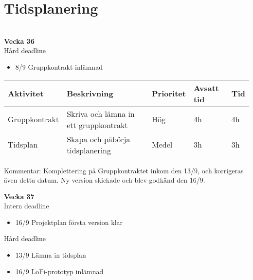 \documentclass{mall}
\begin{document}
\pagebreak

\section{Tidsplanering} \\

\hphantom{$\bullet$} \textbf{Vecka 36}\\

Hård deadline
\begin{itemize}
\color{red}
    \item 8/9 Gruppkontrakt inlämnad
\end{itemize}

\begin{table}[h]
\begin{tabularx}{\textwidth}{|l|X|l|l|l|}
\hline
Aktivitet     & Beskrivning                            & Prioritet  & Avsatt tid & Tid \\ \hline
Gruppkontrakt & Skriva och lämna in ett gruppkontrakt  & Hög   & 4h          & 4h   \\ \hline
Tidsplan      & Skapa och påbörja tidsplanering        & Medel & 3h          & 3h  \\ \hline
\end{tabularx}
\end{table}

Kommentar: Komplettering på Gruppkontraktet inkom den 13/9, och korrigeras även detta datum. Ny version skickade och blev godkänd den 16/9.
\pagebreak

\hphantom{$\bullet$} \textbf{Vecka 37}\\

Intern deadline
\begin{itemize}
\color{blue}
    \item 16/9 Projektplan första version klar
\end{itemize}

Hård deadline
\begin{itemize}
\color{red}
    \item 13/9 Lämna in tidsplan

    \item 16/9 LoFi-prototyp inlämnad
\end{itemize}
\end{document}
